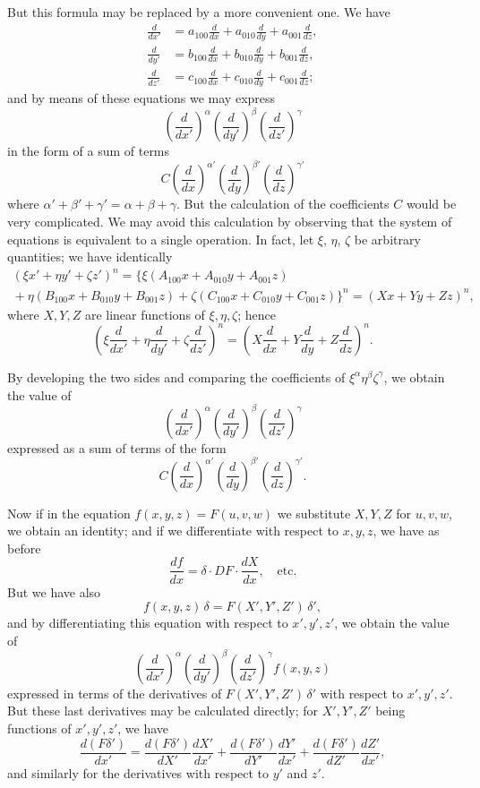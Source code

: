 \documentclass[11pt]{article}
\begin{document}
But this formula may be replaced by a more convenient one. We have
\begin{align*}
\frac{d}{dx'} &= a_{100}\frac{d}{dx} + a_{010}\frac{d}{dy} + a_{001}\frac{d}{dz}, \\
\frac{d}{dy'} &= b_{100}\frac{d}{dx} + b_{010}\frac{d}{dy} + b_{001}\frac{d}{dz}, \\
\frac{d}{dz'} &= c_{100}\frac{d}{dx} + c_{010}\frac{d}{dy} + c_{001}\frac{d}{dz};
\end{align*}
and by means of these equations we may express
\[
\left(\frac{d}{dx'}\right)^\alpha
\left(\frac{d}{dy'}\right)^\beta
\left(\frac{d}{dz'}\right)^\gamma
\]
in the form of a sum of terms
\[
C \left(\frac{d}{dx}\right)^{\alpha'} \left(\frac{d}{dy}\right)^{\beta'} \left(\frac{d}{dz}\right)^{\gamma'}
\]
where $\alpha'+\beta'+\gamma' = \alpha+\beta+\gamma$. But the calculation of the coefficients $C$ would be very complicated. We may avoid this calculation by observing that the system of equations is equivalent to a single operation. In fact, let $\xi$, $\eta$, $\zeta$ be arbitrary quantities; we have identically
\begin{multline*}
(\xi x' + \eta y' + \zeta z')^n
= \bigl\{\xi(A_{100}x + A_{010}y + A_{001}z) \\
\mbox{}+ \eta(B_{100}x + B_{010}y + B_{001}z)
+ \zeta(C_{100}x + C_{010}y + C_{001}z) \bigr\}^n
= (Xx + Yy + Zz)^n,
\end{multline*}
where $X,Y,Z$ are linear functions of $\xi,\eta,\zeta$; hence
\[
\left(\xi\frac{d}{dx'} + \eta\frac{d}{dy'} + \zeta\frac{d}{dz'}\right)^n
= \left(X\frac{d}{dx} + Y\frac{d}{dy} + Z\frac{d}{dz}\right)^n.
\]

By developing the two sides and comparing the coefficients of $\xi^\alpha\eta^\beta\zeta^\gamma$, we obtain the value of
\[
\left(\frac{d}{dx'}\right)^\alpha
\left(\frac{d}{dy'}\right)^\beta
\left(\frac{d}{dz'}\right)^\gamma
\]
expressed as a sum of terms of the form
\[
C \left(\frac{d}{dx}\right)^{\alpha'} \left(\frac{d}{dy}\right)^{\beta'} \left(\frac{d}{dz}\right)^{\gamma'}.
\]

Now if in the equation $f(x,y,z)=F(u,v,w)$ we substitute $X,Y,Z$ for $u,v,w$, we obtain an identity; and if we differentiate with respect to $x,y,z$, we have as before
\[
\frac{df}{dx} = \delta \cdot DF \cdot \frac{dX}{dx}, \quad \text{etc.}
\]
But we have also
\[
f(x,y,z)\,\delta = F(X',Y',Z')\,\delta',
\]
and by differentiating this equation with respect to $x',y',z'$, we obtain the value of
\[
\left(\frac{d}{dx'}\right)^\alpha
\left(\frac{d}{dy'}\right)^\beta
\left(\frac{d}{dz'}\right)^\gamma f(x,y,z)
\]
expressed in terms of the derivatives of $F(X',Y',Z')\,\delta'$ with respect to $x',y',z'$. But these last derivatives may be calculated directly; for $X',Y',Z'$ being functions of $x',y',z'$, we have
\[
\frac{d(F\delta')}{dx'} = \frac{d(F\delta')}{dX'}\frac{dX'}{dx'} + \frac{d(F\delta')}{dY'}\frac{dY'}{dx'} + \frac{d(F\delta')}{dZ'}\frac{dZ'}{dx'},
\]
and similarly for the derivatives with respect to $y'$ and $z'$.
\end{document}
